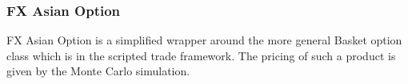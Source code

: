 \subsubsection{FX Asian Option}
\label{pricing:fx_asianoption}

FX Asian Option is a simplified wrapper around the more general Basket option class 
which is in the scripted trade framework. The pricing of such a product is given by the 
Monte Carlo simulation. 